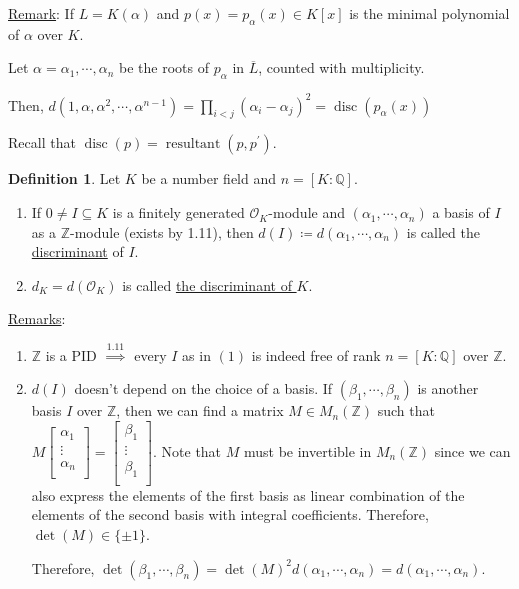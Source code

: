 \documentclass[openany]{amsbook}
\numberwithin{section}{chapter}
\theoremstyle{definition}
\newtheorem*{definition}{Definition}
\begin{document}
\underline{Remark}: If \(L = K(\alpha)\) and \(p(x) = p_\alpha(x) \in K[x]\) is the minimal polynomial of \(\alpha\) over \(K\).

Let \(\alpha = \alpha_1, \cdots, \alpha_n\) be the roots of \(p_\alpha\) in \(\overline{L}\), counted with multiplicity.

Then, \(d(1, \alpha, \alpha^2, \cdots, \alpha^{n-1}) = \prod_{i < j}^{} (\alpha_i - \alpha_j)^2 = \operatorname{disc}(p_\alpha(x))\)

Recall that \(\operatorname{disc}(p) = \operatorname{resultant}(p, p^{\prime}) \).

\begin{definition}
    Let \(K\) be a number field and \(n = [K : \mathbb{Q}]\).

    \begin{enumerate}[label=\arabic*)]
        \item If \(0 \neq I \subseteq K\) is a finitely generated \(\mathcal{O}_K\)-module and \((\alpha_1, \cdots, \alpha_n)\) a basis of \(I\) as a \(\mathbb{Z}\)-module (exists by 1.11), then \(d(I) \coloneqq d(\alpha_1, \cdots, \alpha_n)\) is called the \underline{discriminant} of \(I\).
        \item \(d_K = d(\mathcal{O}_K)\) is called \underline{the discriminant of \(K\)}.
    \end{enumerate} 

\end{definition}

\underline{Remarks}:

\begin{enumerate}[label=\arabic*)]
    \item \(\mathbb{Z}\) is a PID \(\overset{1.11}{\implies}\) every \(I\) as in \((1)\) is indeed free of rank \(n = [K : \mathbb{Q}]\) over \(\mathbb{Z}\).
    \item \(d(I)\) doesn't depend on the choice of a basis. If \((\beta_1, \cdots, \beta_n)\) is another basis \(I\) over \(\mathbb{Z}\), then we can find a matrix \(M \in M_n(\mathbb{Z})\) such that \(M \begin{bmatrix}
         \alpha_1 \\
         \vdots \\
         \alpha_n \\
    \end{bmatrix} = \begin{bmatrix}
         \beta_1 \\
         \vdots \\
         \beta_1 \\
    \end{bmatrix}\). Note that \(M\)  must be invertible in \(M_n(\mathbb{Z})\) since we can also express the elements of the first basis as linear combination of the elements of the second basis with integral coefficients. Therefore, \(\det(M) \in \{ \pm 1 \}\).

    Therefore, \(\det(\beta_1, \cdots, \beta_n) = \det(M)^2 d(\alpha_1, \cdots, \alpha_n) = d(\alpha_1, \cdots, \alpha_n)\).
\end{enumerate}
\end{document}
